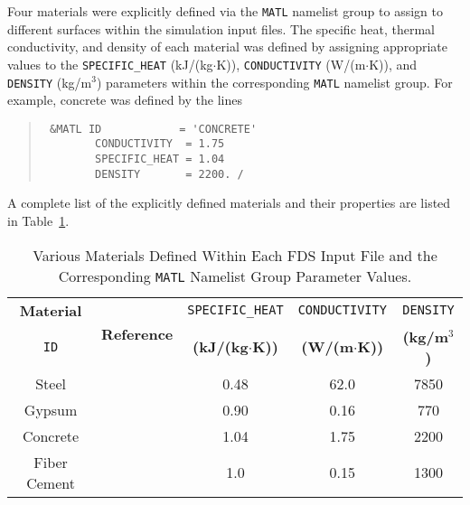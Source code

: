 Four materials were explicitly defined via the \verb|MATL| namelist group to assign to different surfaces within the simulation input files. The specific heat, thermal conductivity, and density of each material was defined by assigning appropriate values to the \verb|SPECIFIC_HEAT| (kJ/(kg$\cdot$K)), \verb|CONDUCTIVITY| (W/(m$\cdot$K)), and \verb|DENSITY| (kg/m$^3$) parameters within the corresponding \verb|MATL| namelist group. For example, concrete was defined by the lines
\begin{quote}
\begin{verbatim}
 &MATL ID            = 'CONCRETE'                                              
        CONDUCTIVITY  = 1.75        
        SPECIFIC_HEAT = 1.04       
        DENSITY       = 2200. /
\end{verbatim}
\end{quote}
A complete list of the explicitly defined materials and their properties are listed in Table~\ref{table:material_props}.
\begin{table}[!ht]
\cprotect\caption{Various Materials Defined Within Each FDS Input File and the Corresponding \verb|MATL| Namelist Group Parameter Values.}
\begin{center}
\begin{tabular}{ccccc}
\toprule
\textbf{Material}  &  \multirow{2}{*}{\textbf{Reference}} & \verb|SPECIFIC_HEAT|	        &  \verb|CONDUCTIVITY| 	      & \verb|DENSITY| 	\\
\verb|ID|		       &                                      &   \textbf{(kJ/(kg$\cdot$K))} 	& 	\textbf{(W/(m$\cdot$K))} 	&  \textbf{(kg/m$^3$)} 		\\
\midrule
Steel 			       & 	     \cite{Gross:Props}             &	        0.48   		            &  		 62.0	 		              & 	 7850  			\\
Gypsum 			       & 	     \cite{Gross:Props}             &	        0.90                  &  		 0.16	 		              & 	  770  			\\
Concrete 		       & 	     \cite{Gross:Props}             &	        1.04   		            &  		 1.75	 		              & 	 2200  			\\
Fiber Cement 	     &       \cite{Durock:specs}            &		      1.0     		          &  		 0.15	 		              & 	 1300  			\\
\bottomrule
\end{tabular}
\end{center}
\label{table:material_props}
\end{table}
